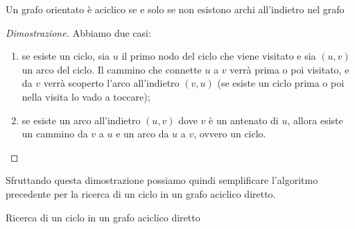 \begin{theorem*}
Un grafo orientato è aciclico se e solo se non esistono archi all'indietro nel grafo
\end{theorem*}

\begin{proof}[Dimostrazione]
Abbiamo due casi:
\begin{enumerate}
	\item se esiste un ciclo, sia \(u\) il primo nodo del ciclo che viene visitato e sia \((u,v)\) un arco del ciclo.
	Il cammino che connette \(u\) a \(v\) verrà prima o poi visitato, e da \(v\) verrà scoperto l'arco all'indietro \((v, u)\) (se esiste un ciclo prima o poi nella visita lo vado a toccare);
	\item se esiste un arco all'indietro \((u,v)\) dove \(v\) è un antenato di \(u\), allora esiste un cammino da \(v\) a \(u\) e un arco da \(u\) a \(v\), ovvero un ciclo.
\end{enumerate}
\end{proof}
Sfruttando questa dimostrazione possiamo quindi semplificare l'algoritmo precedente per la ricerca di un ciclo in un grafo aciclico diretto.

\begin{algorithm}[H]
	\caption{Ricerca di un ciclo in un grafo aciclico diretto}
	
\end{algorithm}

